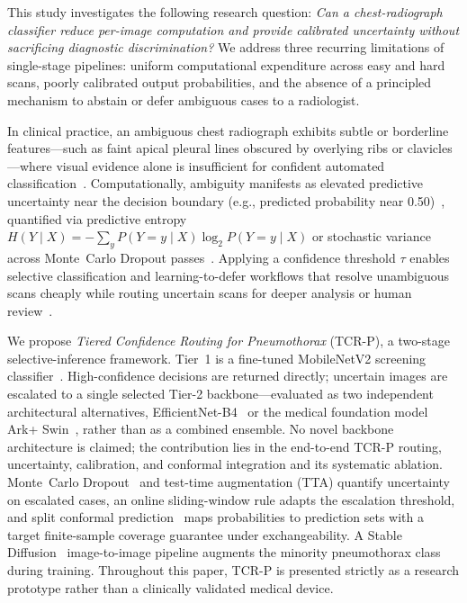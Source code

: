 \documentclass[diagnostics,article,submit,moreauthors]{Definitions/mdpi}
\newcommand{\rev}[1]{#1}
\begin{document}
This study investigates the following research question: \textit{Can a chest-radiograph classifier reduce per-image computation and provide calibrated uncertainty without sacrificing diagnostic discrimination?} We address three recurring limitations of single-stage pipelines: uniform computational expenditure across easy and hard scans, poorly calibrated output probabilities, and the absence of a principled mechanism to abstain or defer ambiguous cases to a radiologist.

In clinical practice, an ambiguous chest radiograph exhibits subtle or borderline features---such as faint apical pleural lines obscured by overlying ribs or clavicles---where visual evidence alone is insufficient for confident automated classification~\cite{graham2023uncertainty}. Computationally, ambiguity manifests as elevated predictive uncertainty near the decision boundary (e.g., predicted probability near 0.50)~\cite{mozannar2020consistent}, quantified via predictive entropy $H(Y \mid X) = -\sum_{y} P(Y=y \mid X)\log_2 P(Y=y \mid X)$ or stochastic variance across Monte~Carlo Dropout passes~\cite{gal2016dropout, graham2023uncertainty}. Applying a confidence threshold $\tau$ enables selective classification and learning-to-defer workflows that resolve unambiguous scans cheaply while routing uncertain scans for deeper analysis or human review~\cite{mozannar2020consistent, geifman2017selective}.

We propose \emph{Tiered Confidence Routing for Pneumothorax} (TCR-P), a two-stage selective-inference framework. Tier~1 is a fine-tuned MobileNetV2 screening classifier~\cite{sandler2018mobilenetv2, sharma2025mobilenetv2}. High-confidence decisions are returned directly; uncertain images are escalated to \rev{a single selected Tier-2 backbone---evaluated as two independent architectural alternatives, EfficientNet-B4~\cite{tan2019efficientnet, chen2026efficientnet} or the medical foundation model Ark+ Swin~\cite{ma2025arkplus, liu2021swin}, rather than as a combined ensemble.} No novel backbone architecture is claimed; the contribution lies in the end-to-end TCR-P routing, uncertainty, calibration, and conformal integration and its systematic ablation. Monte~Carlo Dropout~\cite{gal2016dropout} and test-time augmentation (TTA) quantify uncertainty on escalated cases, an online sliding-window rule adapts the escalation threshold, and split conformal prediction~\cite{vovk2005algorithmic, shafer2008tutorial} maps probabilities to prediction sets with a target finite-sample coverage guarantee under exchangeability. A Stable Diffusion~\cite{rombach2022high} image-to-image pipeline augments the minority pneumothorax class during training. Throughout this paper, TCR-P is presented strictly as a research prototype rather than a clinically validated medical device.
\end{document}
